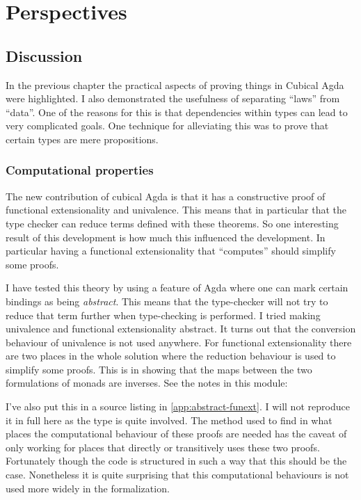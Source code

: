 \chapter{Perspectives}
\section{Discussion}
In the previous chapter the practical aspects of proving things in
Cubical Agda were highlighted. I also demonstrated the usefulness of
separating ``laws'' from ``data''. One of the reasons for this is that
dependencies within types can lead to very complicated goals. One
technique for alleviating this was to prove that certain types are
mere propositions.

\subsection{Computational properties}
The new contribution of cubical Agda is that it has a constructive
proof of functional extensionality
and univalence. This means that in particular that
the type checker can reduce terms defined with these theorems. So one
interesting result of this development is how much this influenced the
development. In particular having a functional extensionality that
``computes'' should simplify some proofs.

I have tested this theory by using a feature of Agda where one can
mark certain bindings as being \emph{abstract}. This means that the
type-checker will not try to reduce that term further when
type-checking is performed. I tried making univalence and functional
extensionality abstract. It turns out that the conversion behaviour of
univalence is not used anywhere. For functional extensionality there
are two places in the whole solution where the reduction behaviour is
used to simplify some proofs. This is in showing that the maps between
the two formulations of monads are inverses. See the notes in this
module:
%
\begin{center}
\end{center}
%
I've also put this in a source listing in \ref{app:abstract-funext}. I
will not reproduce it in full here as the type is quite involved. The
method used to find in what places the computational behaviour of
these proofs are needed has the caveat of only working for places that
directly or transitively uses these two proofs. Fortunately though the
code is structured in such a way that this should be the case.
Nonetheless it is quite surprising that this computational behaviours
is not used more widely in the formalization.

